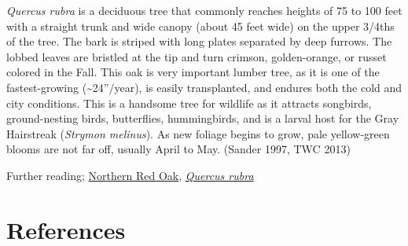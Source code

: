 \documentclass[
]{article}
\begin{document}
\emph{Quercus rubra} is a deciduous tree that commonly reaches heights of 75 to 100 feet with a straight trunk and wide canopy (about 45 feet wide) on the upper 3/4ths of the tree. The bark is striped with long plates separated by deep furrows. The lobbed leaves are bristled at the tip and turn crimson, golden-orange, or russet colored in the Fall. This oak is very important lumber tree, as it is one of the fastest-growing (\textasciitilde24''/year), is easily transplanted, and endures both the cold and city conditions. This is a handsome tree for wildlife as it attracts songbirds, ground-nesting birds, butterflies, hummingbirds, and is a larval host for the Gray Hairstreak (\emph{Strymon melinus}). As new foliage begins to grow, pale yellow-green blooms are not far off, usually April to May. (Sander 1997, TWC 2013)

Further reading; \href{https://www.srs.fs.usda.gov/pubs/misc/ag_654/volume_2/quercus/rubra.htm}{Northern Red Oak}, \href{https://www.wildflower.org/plants/result.php?id_plant=quru}{\emph{Quercus rubra}}

\hypertarget{references}{%
\section*{References}\label{references}}
\end{document}
